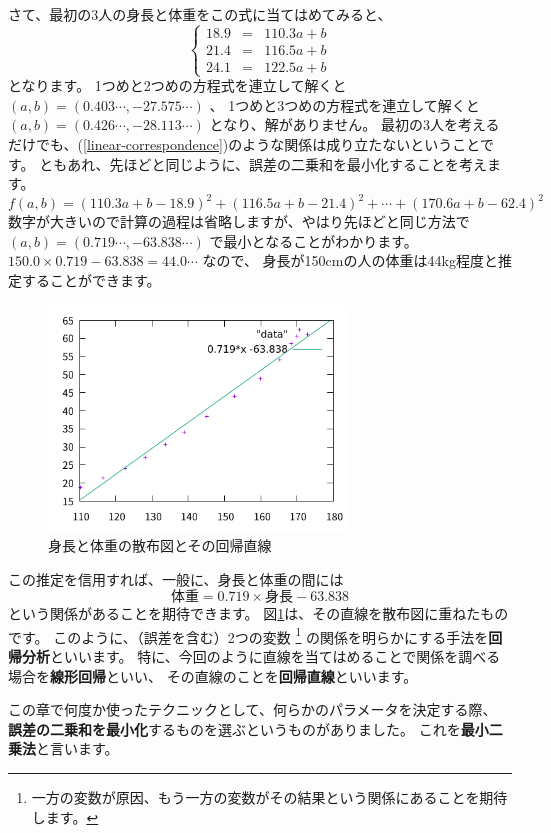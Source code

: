 \documentclass[uplatex,dvipdfmx]{jsarticle}
\begin{document}
  さて、最初の3人の身長と体重をこの式に当てはめてみると、
  \[
    \left\{
    \begin{array}{lll}
      18.9 &=& 110.3a +b \\
      21.4 &=& 116.5a +b \\
      24.1 &=& 122.5a +b
    \end{array}
    \right.
  \]
  となります。
  1つめと2つめの方程式を連立して解くと $(a,b) = (0.403\cdots, -27.575\cdots)$ 、
  1つめと3つめの方程式を連立して解くと $(a,b) = (0.426\cdots, -28.113\cdots)$ となり、解がありません。
  最初の3人を考えるだけでも、(\ref{linear-correspondence})のような関係は成り立たないということです。
  ともあれ、先ほどと同じように、誤差の二乗和を最小化することを考えます。
  \[
    f(a,b) = (110.3a+b-18.9)^2 + (116.5a+b-21.4)^2 + \cdots + (170.6a+b-62.4)^2
  \]
  数字が大きいので計算の過程は省略しますが、やはり先ほどと同じ方法で
  $(a,b) = (0.719\cdots, -63.838\cdots)$ で最小となることがわかります。
  $150.0 \times 0.719 -63.838 = 44.0\cdots$ なので、
  身長が150cmの人の体重は44kg程度と推定することができます。

  \begin{figure}
    \centering
    \includegraphics[width=8cm]{scatter2.png}
    \caption{身長と体重の散布図とその回帰直線}
    \label{scatter2}
  \end{figure}

  この推定を信用すれば、一般に、身長と体重の間には
  \[
    \mbox{体重} = 0.719 \times \mbox{身長} - 63.838
  \]
  という関係があることを期待できます。
  図\ref{scatter2}は、その直線を散布図に重ねたものです。
  このように、（誤差を含む）2つの変数
  \footnote{
    一方の変数が原因、もう一方の変数がその結果という関係にあることを期待します。
  }
  の関係を明らかにする手法を\textbf{回帰分析}といいます。
  特に、今回のように直線を当てはめることで関係を調べる場合を\textbf{線形回帰}といい、
  その直線のことを\textbf{回帰直線}といいます。

  この章で何度か使ったテクニックとして、何らかのパラメータを決定する際、
  \textbf{誤差の二乗和を最小化}するものを選ぶというものがありました。
  これを\textbf{最小二乗法}と言います。
\end{document}
